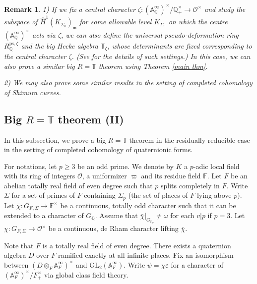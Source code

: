 \documentclass[a4paper, 12pt]{amsart}
\newtheorem{rem}[thm]{\bf Remark}
\DeclareMathOperator{\Spec}{Spec}
\def\ps{\mathrm{ps}}
\newcommand{\F}{\mathbb{F}}
\newcommand{\Q}{\mathbb{Q}}
\newcommand{\T}{\mathbb{T}}
\newcommand{\A}{\mathbb{A}}
\newcommand{\GL}{\mathrm{GL}}
\newcommand{\cO}{\mathcal{O}}
\newcommand{\km}{\mathfrak{m}}
\begin{document}
    \begin{rem}
    	1) If we fix a central character $\zeta : (\A_\Q^\infty)^\times/\Q_{+}^\times \to \cO^\times$ and study the subspace of  $ \widehat{H}^1(K_{\Sigma_0})_\km$ for some allowable level $K_{\Sigma_0} $ on which the centre  $(\A_\Q^\infty)^\times $ acts via $\zeta$, we can also define the universal pseudo-deformation ring $R_\Q^{\ps, \zeta}$ and the big Hecke algebra $\T_\zeta$, whose determinants are fixed corresponding to the central character $\zeta$. (See \cite[Section 6]{Pan_2022} for the details of such settings.) In this case, we can also prove a similar big $R=\T$ theorem using Theorem \ref{main thm}.
    	
    	
    	2) We may also prove some similar results in the setting of completed cohomology of Shimura curves.
    \end{rem}
    
    \subsection{Big $R=\T$ theorem (II)}
    In this subsection, we prove a big $R=\T$ theorem in the residually reducible case in the setting of completed cohomology of quaternionic forms. 
    
    For notations, let $p \ge 3$ be an odd prime. We denote by $K$  a $p$-adic local field with its ring of integers $\cO$, a uniformizer $\varpi$ and its residue field $\F$. Let $F$ be an abelian totally real field of even degree such that $p$ splits completely in $F$. Write $\Sigma$ for a set of primes of $F$ containing $\Sigma_p$ (the set of places of $F$ lying above $p$). Let $\bar{\chi} : G_{F, \Sigma} \to \F^\times$ be a continuous, totally odd character such that it can be extended to a character of $G_\Q$. Assume that $\bar{\chi}|_{G_{\F_v}} \ne \omega$ for each $v|p$ if $p=3$. Let $\chi : G_{F, \Sigma} \to \cO^\times$ be a continuous, de Rham character lifting $\bar{\chi}$.
    
    Note that $F$ is a totally real field of even degree. There exists a quaternion algebra $D$ over $F$ ramified exactly at all infinite places. Fix an isomorphism between $(D \otimes_{F}\A_{F}^\infty )^\times$ and $\GL_2(\A_{F}^\infty)$. Write $\psi = \chi \varepsilon$ for a character of $(\A_F^\infty)^\times/F_{+}^\times $ via global class field theory.
    
\end{document}
